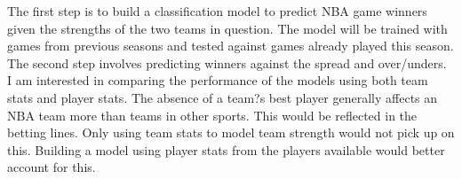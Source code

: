 \documentclass{article}
\begin{document}
The first step is to build a classification model to predict NBA game winners given the strengths of the two teams in question. The model will be trained with games from previous seasons and tested against games already played this season. The second step involves predicting winners against the spread and over/unders. I am interested in comparing the performance of the models using both team stats and player stats. The absence of a team?s best player generally affects an NBA team more than teams in other sports. This would be reflected in the betting lines. Only using team stats to model team strength would not pick up on this. Building a model using player stats from the players available would better account for this.
\end{document}
